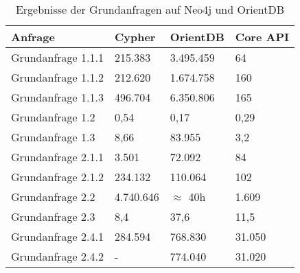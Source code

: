\begin{table}[h]
	\centering
	\begin{tabular}{ |p{6cm}||p{2cm}|p{2cm}|p{2cm}|  }
		\hline
		Anfrage& Cypher & OrientDB & Core API \\
		\hline
	Grundanfrage 1.1.1  & 215.383 & 3.495.459    &  64\\
	Grundanfrage 1.1.2& 212.620 & 1.674.758   & 160   \\
	Grundanfrage 1.1.3& 496.704 & 6.350.806 & 165  \\
	Grundanfrage 1.2& 0,54 & 0,17   & 0,29   \\
	Grundanfrage 1.3 & 8,66& 83.955  & 3,2    \\
	Grundanfrage 2.1.1& 3.501 & 72.092   & 84   \\
	Grundanfrage 2.1.2& 234.132& 110.064  & 102    \\
	Grundanfrage 2.2& 4.740.646 &  $\approx$ 40h   & 1.609  \\
	Grundanfrage 2.3& 8,4  & 37,6   & 11,5   \\
	Grundanfrage 2.4.1& 284.594 & 768.830  & 31.050\\
	Grundanfrage 2.4.2& -  & 774.040   & 31.020   \\
		\hline
	\end{tabular}
	\caption{Ergebnisse der Grundanfragen auf Neo4j und OrientDB}
	\label{tab:Query3}
\end{table}
\FloatBarrier

